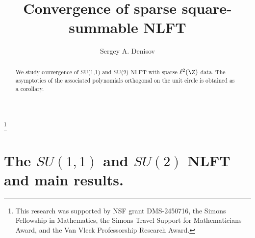 \documentclass[twoside,a4paper]{amsart}
\theoremstyle{remark}
\numberwithin{equation}{section}
\begin{document}
\title[Convergence  \ldots \ldots]{
Convergence of sparse square-summable NLFT}

\begin{abstract}  We study convergence of SU(1,1) and SU(2) NLFT with sparse $\ell^2(\Z)$ data. The asymptotics of the associated  polynomials orthogonal on the unit circle is obtained as a corollary. 
\end{abstract} \vspace{1cm}


 


\author[Sergey A. Denisov]{Sergey A. Denisov}
\address{Department of Mathematics, University of Wisconsin-Madison, 480 Lincoln Dr., Madison, WI 53706, USA}


\thanks{
This research was supported by   NSF grant DMS-2450716, the Simons Fellowship in Mathematics, the Simons Travel Support for Mathematicians Award, and the Van Vleck Professorship Research Award. 
}





\subjclass{}

\keywords{}

\maketitle

\setcounter{tocdepth}{3}







\section{ The $SU(1,1)$ and $SU(2)$ NLFT and main results.}

\medskip
\end{document}
